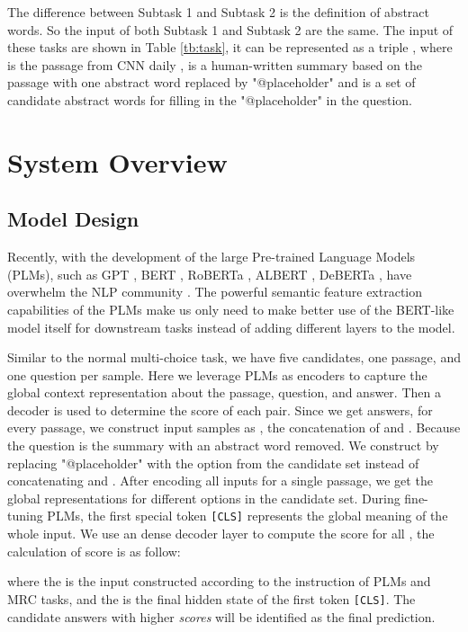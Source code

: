 \documentclass[11pt,a4paper]{article}
\begin{document}
The difference between Subtask 1 and Subtask 2 is the definition of abstract words.
So the input of both Subtask 1 and Subtask 2 are the same.
The input of these tasks are shown in Table \ref{tb:task}, it can be represented as a triple , where  is the passage from CNN daily  \cite{hermann_teaching_2015},  is a human-written summary based on the passage with one abstract word replaced by "@placeholder" and  is a set of candidate abstract words for filling in the "@placeholder" in the question. 

\section{System Overview}
\label{sect:system-overview}
\subsection{Model Design}

Recently, with the development of the large Pre-trained Language Models (PLMs), such as GPT \cite{gpt}, BERT  \cite{devlin_bert_2019}, RoBERTa \cite{roberta}, ALBERT \cite{lan_albert_2020}, DeBERTa \cite{he_deberta_2021}, have overwhelm the NLP community \cite{zhang2020conceptualized}.
The powerful semantic feature extraction capabilities of the PLMs make us only need to make better use of the BERT-like model itself for downstream tasks instead of adding different layers to the model. 

Similar to the normal multi-choice task, we have five candidates, one passage, and one question per sample.
Here we leverage PLMs as encoders to capture the global context representation about the passage, question, and answer.
Then a decoder is used to determine the score of each   pair. 
Since we get   answers, for every passage, we construct  input samples as , the concatenation of  and  .
Because the question is the summary with an abstract word removed.
We construct  by replacing "@placeholder" with the option from the candidate set instead of concatenating  and .
After encoding all  inputs for a single passage, we get the global representations  for different options in the candidate set.
During fine-tuning PLMs,  the first special token \texttt{[CLS]} represents the global meaning of the whole input.
We use an dense decoder layer to compute the score for all , the calculation of score is as follow:




where the  is the input constructed according to the instruction of PLMs and MRC tasks, and the  is the final hidden state of the first token \texttt{[CLS]}.
The candidate answers with higher \textit{scores} will be identified as the final prediction. 
\end{document}

